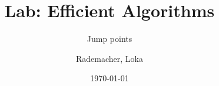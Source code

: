 \title[slide $\text{\insertframenumber}$]{Lab: Efficient Algorithms}
\subtitle{Jump points}
\author{Rademacher, Loka}
\date{\today}
